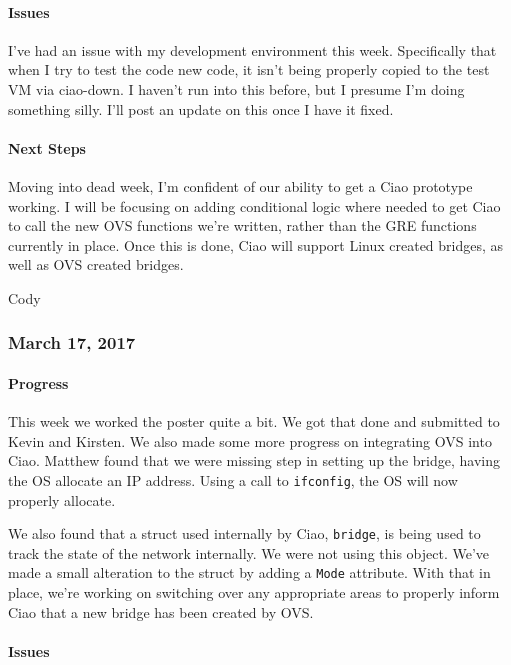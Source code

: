 \documentclass[10pt,onecolumn,journal,draftclsnofoot]{IEEEtran}
\begin{document}
\paragraph{Issues} 

I've had an issue with my development environment this week.
Specifically that when I try to test the code new code, it isn't being
properly copied to the test VM via ciao-down. I haven't run into this
before, but I presume I'm doing something silly. I'll post an update on
this once I have it fixed.

\paragraph{Next Steps} 

Moving into dead week, I'm confident of our ability to get a Ciao
prototype working. I will be focusing on adding conditional logic where
needed to get Ciao to call the new OVS functions we're written, rather
than the GRE functions currently in place. Once this is done, Ciao will
support Linux created bridges, as well as OVS created bridges.

Cody

\subsubsection{March 17, 2017} 

\paragraph{Progress} 

This week we worked the poster quite a bit. We got that done and
submitted to Kevin and Kirsten. We also made some more progress on
integrating OVS into Ciao. Matthew found that we were missing step in
setting up the bridge, having the OS allocate an IP address. Using a
call to \lstinline!ifconfig!, the OS will now properly allocate.

We also found that a struct used internally by Ciao, \lstinline!bridge!,
is being used to track the state of the network internally. We were not
using this object. We've made a small alteration to the struct by adding
a \lstinline!Mode! attribute. With that in place, we're working on
switching over any appropriate areas to properly inform Ciao that a new
bridge has been created by OVS.

\paragraph{Issues} 
\end{document}
